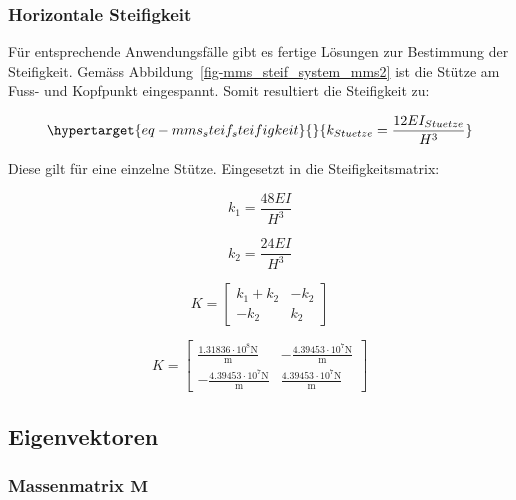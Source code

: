 \documentclass[
  letterpaper,
  DIV=11]{scrreprt}
\begin{document}
\hypertarget{horizontale-steifigkeit-2}{%
\subsubsection{Horizontale
Steifigkeit}\label{horizontale-steifigkeit-2}}

Für entsprechende Anwendungsfälle gibt es fertige Lösungen zur
Bestimmung der Steifigkeit. Gemäss
Abbildung~\ref{fig-mms_steif_system_mms2} ist die Stütze am Fuss- und
Kopfpunkt eingespannt. Somit resultiert die Steifigkeit zu:

\begin{equation}\protect\hypertarget{eq-mms_steif_steifigkeit}{}{
k_{Stuetze} = \frac{12EI_{Stuetze}}{H^3}
}\label{eq-mms_steif_steifigkeit}\end{equation}

Diese gilt für eine einzelne Stütze. Eingesetzt in die
Steifigkeitsmatrix:

\begin{equation}k_{1} = \frac{48 E I}{H^{3}}\end{equation}

\begin{equation}k_{2} = \frac{24 E I}{H^{3}}\end{equation}

\begin{equation}K = \left[\begin{matrix}k_{1} + k_{2} & - k_{2}\\- k_{2} & k_{2}\end{matrix}\right]\end{equation}

\begin{equation}K = \left[\begin{matrix}\frac{1.31836 \cdot 10^{8} \text{N}}{\text{m}} & - \frac{4.39453 \cdot 10^{7} \text{N}}{\text{m}}\\- \frac{4.39453 \cdot 10^{7} \text{N}}{\text{m}} & \frac{4.39453 \cdot 10^{7} \text{N}}{\text{m}}\end{matrix}\right]\end{equation}

\hypertarget{eigenvektoren}{%
\subsection{Eigenvektoren}\label{eigenvektoren}}

\hypertarget{massenmatrix-mathbfm}{%
\subsubsection{\texorpdfstring{Massenmatrix
\(\mathbf{M}\)}{Massenmatrix \textbackslash mathbf\{M\}}}\label{massenmatrix-mathbfm}}
\end{document}
